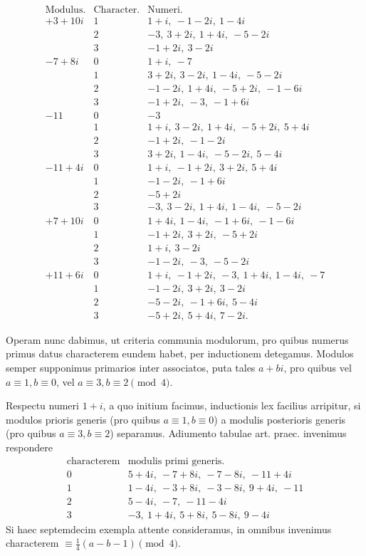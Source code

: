 %
\[
\begin{array}{r|c|l}
\text{Modulus.}&\text{Character.}&\text{Numeri.}\\\hline
+3+10i&1&1+i,\ -1-2i,\ 1-4i\\
&2&-3,\ 3+2i,\ 1+4i,\ -5-2i\\
&3&-1+2i,\ 3-2i\\
-7+8i&0&1+i,\ -7\\
&1&3+2i,\ 3-2i,\ 1-4i,\ -5-2i\\
&2&-1-2i,\ 1+4i,\ -5+2i,\ -1-6i\\
&3&-1+2i,\ -3,\ -1+6i\\
-11&0&-3\\
&1&1+i,\ 3-2i,\ 1+4i,\ -5+2i,\ 5+4i\\
&2&-1+2i,\ -1-2i\\
&3&3+2i,\ 1-4i,\ -5-2i,\ 5-4i\\
-11+4i&0&1+i,\ -1+2i,\ 3+2i,\ 5+4i\\
&1&-1-2i,\ -1+6i\\
&2&-5+2i\\
&3&-3,\ 3-2i,\ 1+4i,\ 1-4i,\ -5-2i\\
+7+10i&0&1+4i,\ 1-4i,\ -1+6i,\ -1-6i\\
&1&-1+2i,\ 3+2i,\ -5+2i\\
&2&1+i,\ 3-2i\\
&3&-1-2i,\ -3,\ -5-2i\\
+11+6i&0&1+i,\ -1+2i,\ -3,\ 1+4i,\ 1-4i,\ -7\\
&1&-1-2i,\ 3+2i,\ 3-2i\\
&2&-5-2i,\ -1+6i,\ 5-4i\\
&3&-5+2i,\ 5+4i,\ 7-2i.
\end{array}
\]

Operam nunc dabimus, ut criteria communia modulorum, pro quibus numerus primus datus characterem eundem habet, per inductionem detegamus. Modulos semper supponimus primarios inter associatos, puta tales $a+bi$, pro quibus vel $a\equiv1,b\equiv0$, vel $a\equiv3,b\equiv2\pmod4$.

Respectu numeri $1+i$, a quo initium facimus, inductionis lex facilius arripitur, si modulos prioris generis (pro quibus $a\equiv1,b\equiv0$) a modulis posterioris generis (pro quibus $a\equiv3,b\equiv2$) separamus. Adiumento tabulae art. praec. invenimus respondere
%
\[
\begin{array}{c|l}
\text{characterem}&\text{modulis primi generis.}\\\hline
0&5+4i,\ -7+8i,\ -7-8i,\ -11+4i\\
1&1-4i,\ -3+8i,\ -3-8i,\ 9+4i,\ -11\\
2&5-4i,\ -7,\ -11-4i\\
3&-3,\ 1+4i,\ 5+8i,\ 5-8i,\ 9-4i
\end{array}
\]
Si haec septemdecim exempla attente consideramus, in omnibus invenimus characterem $\equiv\frac14(a-b-1)\pmod4$.

